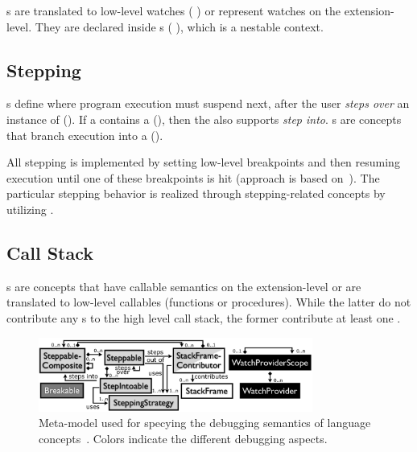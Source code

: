 s are translated to low-level watches (\eg
{}) or represent watches on the extension-level.
They are declared inside s (\eg
{}), which is a nestable context.

\subsection{Stepping} 
s define where program execution must suspend
next, after the user \emph{steps over} 
an instance of  (\eg {}). If a
 contains a  (\eg {}), 
then the  also supports \emph{step into}. s are
concepts that branch execution into a  (\eg {}).

All stepping is implemented by setting low-level breakpoints and then resuming
execution until one of these breakpoints is hit (approach is based
on~\cite{Wu06grammar}). The particular stepping behavior is realized through 
stepping-related concepts by utilizing .

\subsection{Call Stack}
s are
concepts that have callable semantics on the extension-level or are
translated to low-level callables (functions or procedures). While the latter do
not contribute any s to the high level call stack, the former
contribute at least one .

\begin{figure}[h]
  \vspace{-2mm}
  \centering
    \includegraphics[width=9cm]{./figures/debugger-concepts.png} 
    \vspace{-2mm}
    \caption{Meta-model used for specying the debugging semantics of language
    concepts~\cite{DBLP:conf/adaEurope/AdaEuropeDeb}. Colors indicate the
    different debugging aspects.} 
  \label{specabs}
  \vspace{-2mm}
\end{figure}

